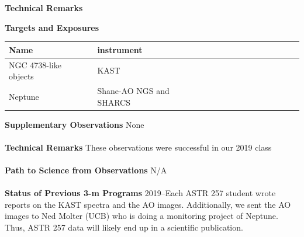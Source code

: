 \documentclass[12pt]{article}
\begin{document}
\clearpage

\newpage

\centerline{\bf Technical Remarks}

\noindent
{\bf Targets and Exposures}

\begin{table}[!h]
\begin{tabular}{lllllllllllll}
\hline
Name & instrument \\
\hline
NGC 4738-like objects             & KAST\\
Neptune             & Shane-AO NGS and SHARCS  \\
\hline
\end{tabular}
\end{table}
\noindent
{\bf Supplementary Observations}
None
\\\\
\noindent
{\bf Technical Remarks}
These observations were successful in our 2019 class
\\\\
\noindent
{\bf Path to Science from Observations}
N/A
\\\\
\noindent
{\bf Status of Previous 3-m Programs}
2019--Each ASTR 257 student wrote reports on the KAST spectra and the AO images.  Additionally, we sent the AO images to Ned Molter (UCB) who is doing a monitoring project of Neptune.  Thus, ASTR 257 data will likely end up in a scientific publication.  
\end{document}
